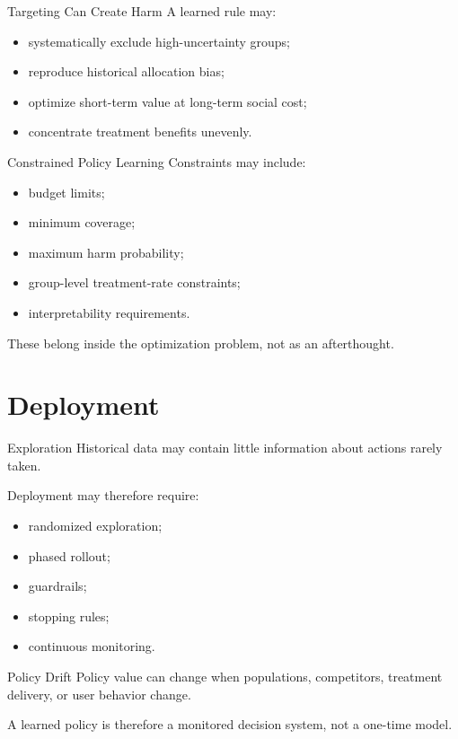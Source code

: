 \documentclass[aspectratio=169,11pt]{beamer}
\begin{document}
\begin{frame}{Targeting Can Create Harm}
A learned rule may:
\begin{itemize}
\item systematically exclude high-uncertainty groups;
\item reproduce historical allocation bias;
\item optimize short-term value at long-term social cost;
\item concentrate treatment benefits unevenly.
\end{itemize}
\end{frame}

\begin{frame}{Constrained Policy Learning}
Constraints may include:
\begin{itemize}
\item budget limits;
\item minimum coverage;
\item maximum harm probability;
\item group-level treatment-rate constraints;
\item interpretability requirements.
\end{itemize}

These belong inside the optimization problem, not as an afterthought.
\end{frame}

\section{Deployment}

\begin{frame}{Exploration}
Historical data may contain little information about actions rarely taken.

Deployment may therefore require:
\begin{itemize}
\item randomized exploration;
\item phased rollout;
\item guardrails;
\item stopping rules;
\item continuous monitoring.
\end{itemize}
\end{frame}

\begin{frame}{Policy Drift}
Policy value can change when populations, competitors, treatment delivery, or user behavior change.

A learned policy is therefore a monitored decision system, not a one-time model.
\end{frame}
\end{document}
